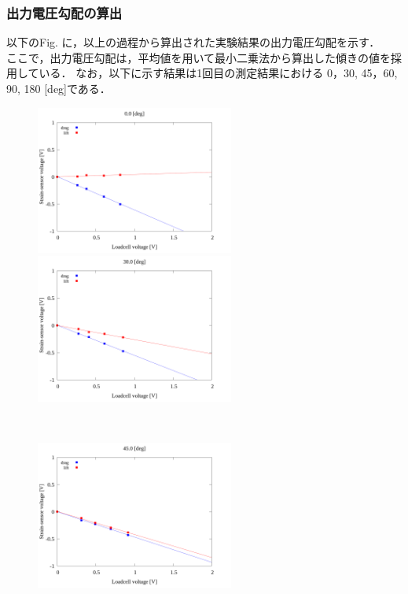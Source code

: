 \newpage

\subsubsection{出力電圧勾配の算出}

以下のFig. に，以上の過程から算出された実験結果の出力電圧勾配を示す．\\
ここで，出力電圧勾配は，平均値を用いて最小二乗法から算出した傾きの値を採用している．
なお，以下に示す結果は1回目の測定結果における 0，30, 45，60, 90, 180 [deg]である．

\begin{figure}[htbp]
    \begin{minipage}[b]{0.45\linewidth}
      \centering
      \includegraphics[width=65mm]{../../02_workspace/result/2-1/plot/04/04_linear_0.png}
    \end{minipage}
    \begin{minipage}[b]{0.45\linewidth}
      \centering
      \includegraphics[width=65mm]{../../02_workspace/result/2-1/plot/04/04_linear_300.png}
    \end{minipage} \\
    \begin{minipage}[b]{0.45\linewidth}
        \centering
        \includegraphics[width=65mm]{../../02_workspace/result/2-1/plot/04/04_linear_450.png}

\end{minipage}
\end{figure}

